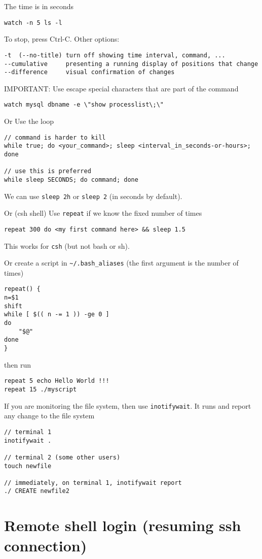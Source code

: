 The time is in seconds
\begin{verbatim}
watch -n 5 ls -l
\end{verbatim}
To stop, press Ctrl-C. Other options:
{\tiny
\begin{verbatim}
-t 	(--no-title) turn off showing time interval, command, ...
--cumulative     presenting a running display of positions that change
--difference     visual confirmation of changes
\end{verbatim}
}

IMPORTANT: Use escape special characters that are part of the command
\begin{verbatim}
watch mysql dbname -e \"show processlist\;\"
\end{verbatim}

Or Use the loop
\begin{verbatim}
// command is harder to kill
while true; do <your_command>; sleep <interval_in_seconds-or-hours>; done

// use this is preferred
while sleep SECONDS; do command; done
\end{verbatim}
We can use \verb!sleep 2h! or \verb!sleep 2! (in seconds by default).


Or (csh shell) Use \verb!repeat! if we know the fixed number of times
\begin{verbatim}
repeat 300 do <my first command here> && sleep 1.5
\end{verbatim}
This works for \verb!csh! (but not bash or sh).

Or create a script in \verb!~/.bash_aliases! (the first argument is the
number of times)
\begin{verbatim}
repeat() {
n=$1
shift
while [ $(( n -= 1 )) -ge 0 ]
do
    "$@"
done
}
\end{verbatim}
then run
\begin{verbatim}
repeat 5 echo Hello World !!!
repeat 15 ./myscript
\end{verbatim}


If you are monitoring the file system, then use \verb!inotifywait!. It runs and
report any change to the file system
\begin{verbatim}
// terminal 1
inotifywait .

// terminal 2 (some other users)
touch newfile

// immediately, on terminal 1, inotifywait report
./ CREATE newfile2
\end{verbatim}

\section{Remote shell login (resuming ssh connection)}
\label{sec:remote_shell-login}

